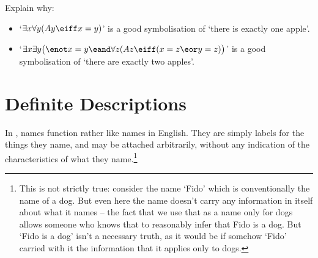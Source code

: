 


\problempart Explain why:
	\begin{itemize}
		\item   `$\exists x \forall y(Ay \eiff x= y)$' is a good symbolisation of `there is exactly one apple'.
		\item `$\exists x \exists y \bigl(\enot x = y \eand \forall z(Az \eiff (x= z \eor y = z) \bigr)$' is a good symbolisation of `there are exactly two apples'.
	\end{itemize}		


\chapter{Definite Descriptions}\label{subsec.defdesc}
In \FOL, names function rather like names in English. They are simply labels for the things they name, and may be attached arbitrarily, without any indication of the characteristics of what they name.\footnote{This is not strictly true: consider the name `Fido' which is conventionally the name of a dog. But even here the name doesn't carry any information in itself about what it names – the fact that we use that as a name only for dogs allows someone who knows that to reasonably infer that Fido is a dog. But `Fido is a dog' isn't a necessary truth, as it would be if somehow `Fido' carried with it the information that it applies only to dogs.} 

